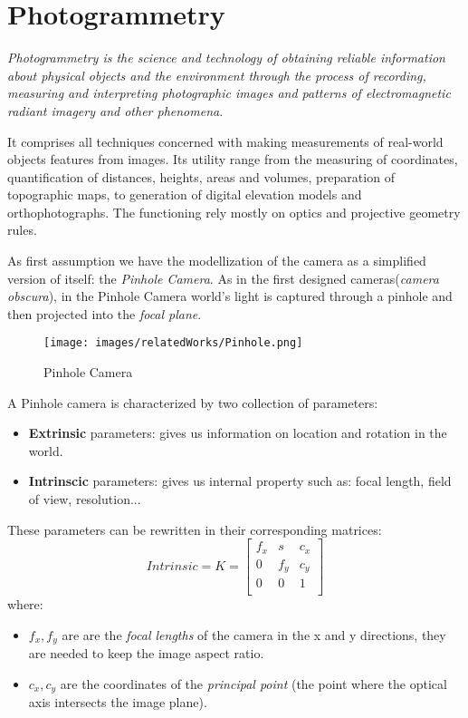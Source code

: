 \chapter{Photogrammetry}
\textit{Photogrammetry is the science and technology of 
obtaining reliable information about physical objects and
the environment through the process of recording,
measuring and interpreting photographic images and patterns 
of electromagnetic radiant imagery and other 
phenomena}\cite{examplewebsite}.

It comprises all techniques concerned with making measurements of
real-world objects features from images.
Its utility range from the measuring of coordinates, quantification
of distances, heights, areas and volumes, preparation
of topographic maps, to generation of digital elevation 
models and orthophotographs. The functioning rely mostly on optics and projective geometry rules. 

\vspace{12pt}

As first assumption we have the modellization of the camera as a simplified
version of itself: the \textit{Pinhole Camera}. As in the first designed
cameras(\textit{camera obscura}), in the Pinhole Camera world's light is 
captured through a pinhole and then projected into the \textit{focal plane}.

\begin{figure}
    \centering
    \texttt{[image: images/relatedWorks/Pinhole.png]} %
    \caption{Pinhole Camera}
    \label{fig:pinhole}
  \end{figure}
  
A Pinhole camera is characterized by two collection of parameters:
\begin{itemize}
    \item  \textbf{Extrinsic} parameters: gives us information on location
                                        and rotation in the world.
    \item  \textbf{Intrinscic} parameters: gives us internal property such as:
                                    focal length, field of view, resolution...
\end{itemize}  
These parameters can be rewritten in their corresponding matrices:
\[
  Intrinsic=K= \begin{bmatrix}
    f_{x} & s & c_{x} \\
    0 & f_{y} & c_{y} \\
    0 & 0     & 1     \\
  \end{bmatrix}
\]
where:
\begin{itemize}
    \item $f_{x},f_{y}$ are are the \textit{focal lengths} of the camera in the x and y directions, 
    they are needed to keep the image aspect ratio.
    \item $c_{x},c_{y}$ are the coordinates of the \textit{principal point}
    (the point where the optical axis intersects the image plane).
\end{itemize}

